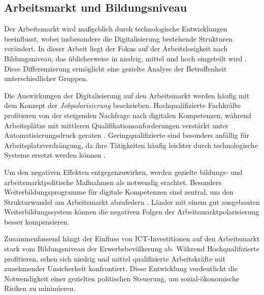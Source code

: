 

\subsection{Arbeitsmarkt und Bildungsniveau}

Der Arbeitsmarkt wird maßgeblich durch technologische Entwicklungen beeinflusst,
wobei insbesondere die Digitalisierung bestehende Strukturen verändert. In dieser
Arbeit liegt der Fokus auf der Arbeitslosigkeit nach Bildungsniveau, das üblicherweise
in niedrig, mittel und hoch eingeteilt wird \parencite[vgl.][S. 35–37]{frey2013thefuture}.
Diese Differenzierung ermöglicht eine gezielte Analyse der Betroffenheit
unterschiedlicher Gruppen.

Die Auswirkungen der Digitalisierung auf den Arbeitsmarkt werden häufig mit dem
Konzept der \textit{Jobpolarisierung} beschrieben. Hochqualifizierte Fachkräfte 
profitieren von der steigenden Nachfrage nach digitalen Kompetenzen, während 
Arbeitsplätze mit mittleren Qualifikationsanforderungen verstärkt unter 
Automatisierungsdruck geraten \parencite[vgl.][S. 40]{autor2015whyare}. 
Geringqualifizierte sind besonders anfällig für Arbeitsplatzverdrängung, da ihre 
Tätigkeiten häufig leichter durch technologische Systeme ersetzt werden können 
\parencite[vgl.][S. 10]{acemoglu2002technical}.

Um den negativen Effekten entgegenzuwirken, werden gezielte bildungs- und
arbeitsmarktpolitische Maßnahmen als notwendig erachtet. Besonders
Weiterbildungsprogramme für digitale Kompetenzen sind zentral, um den
Strukturwandel am Arbeitsmarkt abzufedern 
\parencite[vgl.][S. 75]{brynjolfsson2014thesecond}. Länder mit einem gut ausgebauten 
Weiterbildungssystem können die negativen Folgen der Arbeitsmarktpolarisierung besser 
kompensieren.

Zusammenfassend hängt der Einfluss von \ac{ICT}-Investitionen auf den Arbeitsmarkt
stark vom Bildungsniveau der Erwerbsbevölkerung ab. Während Hochqualifizierte
profitieren, sehen sich niedrig und mittel qualifizierte Arbeitskräfte mit zunehmender
Unsicherheit konfrontiert. Diese Entwicklung verdeutlicht die Notwendigkeit einer
gezielten politischen Steuerung, um sozial-ökonomische Risiken zu minimieren.
